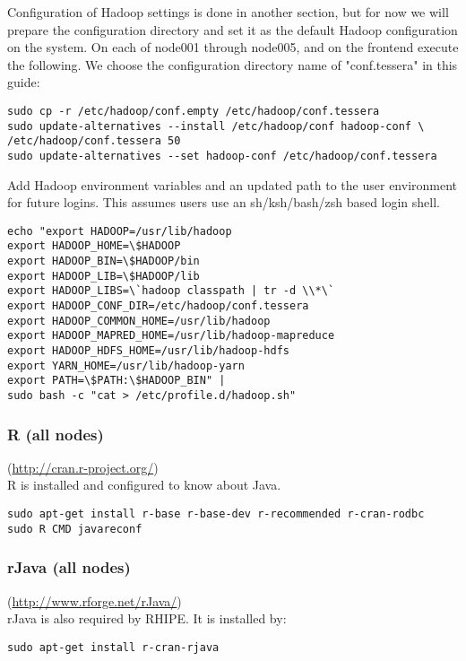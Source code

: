 Configuration of Hadoop settings is done in another section, but for now
we will prepare the configuration directory and set it as the default
Hadoop configuration on the system.  On each of node001 through node005,
and on the frontend execute the following.  We choose the configuration
directory name of "conf.tessera" in this guide:

\begin{verbatim}
sudo cp -r /etc/hadoop/conf.empty /etc/hadoop/conf.tessera
sudo update-alternatives --install /etc/hadoop/conf hadoop-conf \
/etc/hadoop/conf.tessera 50
sudo update-alternatives --set hadoop-conf /etc/hadoop/conf.tessera
\end{verbatim}


Add Hadoop environment variables and an updated path to the user environment for future logins.  This assumes users use an sh/ksh/bash/zsh based login shell.
\begin{verbatim}
echo "export HADOOP=/usr/lib/hadoop
export HADOOP_HOME=\$HADOOP	
export HADOOP_BIN=\$HADOOP/bin
export HADOOP_LIB=\$HADOOP/lib
export HADOOP_LIBS=\`hadoop classpath | tr -d \\*\`
export HADOOP_CONF_DIR=/etc/hadoop/conf.tessera
export HADOOP_COMMON_HOME=/usr/lib/hadoop
export HADOOP_MAPRED_HOME=/usr/lib/hadoop-mapreduce
export HADOOP_HDFS_HOME=/usr/lib/hadoop-hdfs
export YARN_HOME=/usr/lib/hadoop-yarn
export PATH=\$PATH:\$HADOOP_BIN" | 
sudo bash -c "cat > /etc/profile.d/hadoop.sh"
\end{verbatim}

\subsubsection{R (all nodes)} (\url{http://cran.r-project.org/})\\
R is installed and configured to know about Java.
\begin{verbatim}
sudo apt-get install r-base r-base-dev r-recommended r-cran-rodbc
sudo R CMD javareconf
\end{verbatim}

\subsubsection{rJava (all nodes)}(\url{http://www.rforge.net/rJava/})\\
rJava is also required by RHIPE.  It is installed by:

\begin{verbatim}
sudo apt-get install r-cran-rjava
\end{verbatim}

